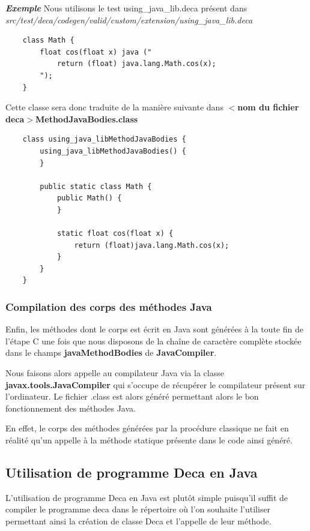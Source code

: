 \documentclass[12pt, a4paper, one side]{article}
\begin{document}
    \textbf{\textit{Exemple}}
    Nous utilisons le test using\_java\_lib.deca présent dans \textit{src/test/deca/codegen/valid/custom/extension/using\_java\_lib.deca}


    \begin{verbatim}
    class Math {
        float cos(float x) java ("
            return (float) java.lang.Math.cos(x);
        ");
    }
    \end{verbatim}

    Cette classe sera donc traduite de la manière suivante dans \textbf{$<$nom du fichier deca$>$MethodJavaBodies.class}

    \begin{verbatim}
    class using_java_libMethodJavaBodies {
        using_java_libMethodJavaBodies() {
        }

        public static class Math {
            public Math() {
            }

            static float cos(float x) {
                return (float)java.lang.Math.cos(x);
            }
        }
    }
    \end{verbatim}

    \subsubsection{Compilation des corps des méthodes Java}
    Enfin, les méthodes dont le corps est écrit en Java sont générées à la toute fin de l'étape C
    une fois que nous disposons de la chaîne de caractère complète stockée dans le champs \textbf{javaMethodBodies} de \textbf{JavaCompiler}.

    Nous faisons alors appelle au compilateur Java via la classe \newline \textbf{javax.tools.JavaCompiler}\cite{ref_javacompiler} qui
    s'occupe de récupérer le compilateur présent sur l'ordinateur. Le fichier .class est alors généré permettant alors le bon fonctionnement des méthodes Java.

    En effet, le corps des méthodes générées par la procédure classique ne fait en réalité qu'un appelle à la méthode statique
    présente dans le code ainsi généré.

    \subsection{Utilisation de programme Deca en Java}
    L'utilisation de programme Deca en Java est plutôt simple puisqu'il suffit de compiler le programme deca dans le répertoire
    où l'on souhaite l'utiliser permettant ainsi la création de classe Deca et l'appelle de leur méthode.
\end{document}
